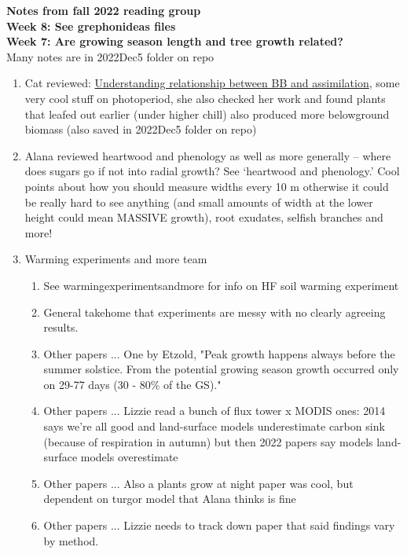 \documentclass[11pt,letter]{article}
\begin{document}

\renewcommand{\refname}{\CHead{}}

{\bf \large Notes from fall 2022 reading group}\\

{\bf Week 8: See grephonideas files}\\

{\bf Week 7: Are growing season length and tree growth related?}\\

Many notes are in 2022Dec5 folder on repo

\begin{enumerate}
\item Cat reviewed: \href{https://docs.google.com/document/d/1Fb_Fe9HC4qS44Sjc47Oxm-cfjiXlvITXNps9bB4lK2g/edit}{Understanding relationship between BB and assimilation}, some very cool stuff on photoperiod, she also checked her work and found plants that leafed out earlier (under higher chill) also produced more belowground biomass (also saved in 2022Dec5 folder on repo)
\item Alana reviewed heartwood and phenology as well as more generally -- where does sugars go if not into radial growth? See `heartwood and phenology.' Cool points about how you should measure widths every 10 m otherwise it could be really hard to see anything (and small amounts of width at the lower height could mean MASSIVE growth), root exudates, selfish branches and more!
\item Warming experiments and more team
\begin{enumerate}
\item See warmingexperimentsandmore for info on HF soil warming experiment
\item General takehome that experiments are messy with no clearly agreeing results. 
\item Other papers ... One by Etzold, "Peak growth happens always before the summer solstice.
From the potential growing season growth occurred only on 29-77 days (30 - 80\% of the GS)."
\item Other papers ... Lizzie read a bunch of flux tower x MODIS ones: 2014 says we're all good and land-surface models underestimate carbon sink (because of respiration in autumn) but then 2022 papers say models land-surface models overestimate 
\item Other papers ... Also a plants grow at night paper was cool, but dependent on turgor model that Alana thinks is fine
\item Other papers ... Lizzie needs to track down paper that said findings vary by method. 

\end{enumerate}
\end{enumerate}
\end{document}
